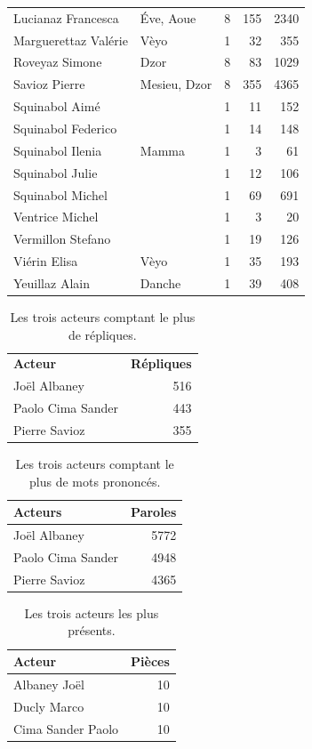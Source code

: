 \begin{longtable}{llrrr}
Lucianaz Francesca &Éve, Aoue & 8 & 155 & 2340\\
Marguerettaz Valérie &Vèyo & 1 & 32 & 355\\
Roveyaz Simone &Dzor & 8 & 83 & 1029\\
Savioz Pierre &Mesieu, Dzor & 8 & 355 & 4365\\
Squinabol Aimé & & 1 & 11 & 152\\
Squinabol Federico & & 1 & 14 & 148\\
Squinabol Ilenia &Mamma & 1 & 3 & 61\\
Squinabol Julie & & 1 & 12 & 106\\
Squinabol Michel & & 1 & 69 & 691\\
Ventrice Michel & & 1 & 3 & 20\\
Vermillon Stefano & & 1 & 19 & 126\\
Viérin Elisa &Vèyo & 1 & 35 & 193\\
Yeuillaz Alain &Danche & 1 & 39 & 408\\
\bottomrule
\end{longtable}
\begin{table}[]
\centering
\caption{Les trois acteurs comptant le plus de répliques.}
\begin{tabular}{l|r}
\toprule
\multicolumn{1}{l}{\textbf{Acteur}} & \textbf{Répliques} \\

\multicolumn{1}{l}{Joël Albaney} &516\\
\multicolumn{1}{l}{Paolo Cima Sander} &443\\
\multicolumn{1}{l}{Pierre Savioz} &355\\
\bottomrule
\end{tabular}%
\end{table}
\begin{table}[]
\centering
\caption{Les trois acteurs comptant le plus de mots prononcés.}
\begin{tabular}{l|r}
    \toprule
\multicolumn{1}{l}{\textbf{Acteurs}} & \textbf{Paroles} \\
    \midrule
\multicolumn{1}{l}{Joël Albaney} &5772\\
\multicolumn{1}{l}{Paolo Cima Sander} &4948\\
\multicolumn{1}{l}{Pierre Savioz} &4365\\
\bottomrule
\end{tabular}%
\end{table}
\begin{table}[]
\centering
\caption{Les trois acteurs les plus présents.}
\begin{tabular}{lr}
    \toprule
\multicolumn{1}{l}{\textbf{Acteur}} & \textbf{Pièces} \\
    \midrule
\multicolumn{1}{l}{Albaney Joël} &10\\
\multicolumn{1}{l}{Ducly Marco} &10\\
\multicolumn{1}{l}{Cima Sander Paolo} &10\\

\bottomrule
\end{tabular}%
\end{table}
